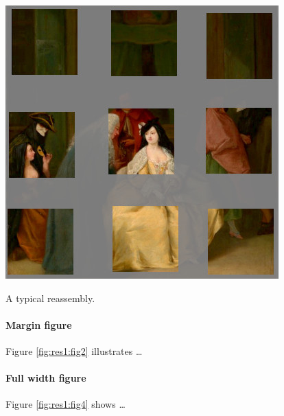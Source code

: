 \begin{marginfigure}[25em]
    \centering
    \includegraphics[width=\linewidth]{30-part1/img/05.jpg}
    \caption[A reassembly]{A typical reassembly.}
    \label{fig:res1:fig2}
\end{marginfigure}

\paragraph{Margin figure} Figure \ref{fig:res1:fig2} illustrates … \blindtext

\paragraph{Full width figure} Figure \ref{fig:res1:fig4} shows … \blindtext

